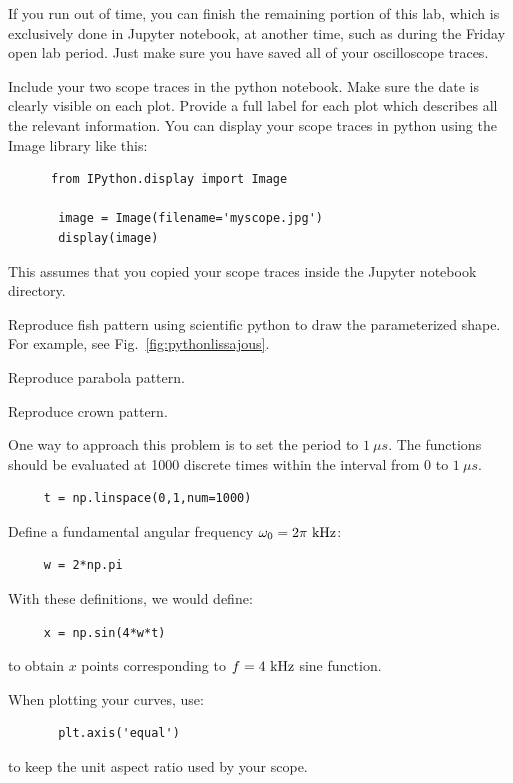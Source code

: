 If you run out of time, you can finish the remaining portion of this
lab, which is exclusively done in Jupyter notebook, at another time,
such as during the Friday open lab period.  Just make sure you have
saved all of your oscilloscope traces.

Include your two scope traces in the python notebook. Make sure the
date is clearly visible on each plot. Provide a full label for each
plot which describes all the relevant information.  You can display
your scope traces in python using the Image library like this:

\begin{verbatim}
      from IPython.display import Image

       image = Image(filename='myscope.jpg') 
       display(image)
\end{verbatim}
This assumes that you copied your scope traces inside the Jupyter notebook directory. 

\begin{plot} Reproduce fish pattern using scientific
python to draw the parameterized shape.  For
example, see Fig.~\ref{fig:pythonlissajous}. \end{plot}
\begin{plot} Reproduce  parabola pattern. \end{plot} 
\begin{plot} Reproduce crown pattern. \end{plot}

One way to approach this problem is to set the period to $1~\mu s$.
The functions should be evaluated at 1000 discrete times within the
interval from 0 to $1~\mu s$.
\begin{verbatim}
     t = np.linspace(0,1,num=1000)
\end{verbatim}
Define a fundamental angular frequency $\omega_0 = 2 \pi~\rm kHz$:
\begin{verbatim}
     w = 2*np.pi
\end{verbatim}
With these definitions, we would define:
\begin{verbatim}
     x = np.sin(4*w*t)
\end{verbatim}
to obtain $x$ points corresponding to $f=4~\rm kHz$ sine function.

When plotting your curves, use:
\begin{verbatim}
       plt.axis('equal')
\end{verbatim}
to keep the unit aspect ratio used by your scope.

